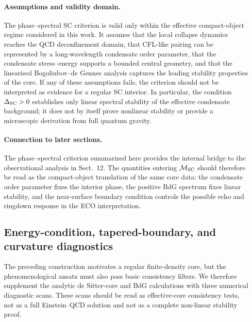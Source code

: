 \documentclass[epj]{svjour}
\begin{document}
\paragraph{Assumptions and validity domain.}
The phase--spectral SC criterion is valid only within the effective
compact-object regime considered in this work. It assumes that the local
collapse dynamics reaches the QCD deconfinement domain, that CFL-like pairing can be represented by a long-wavelength condensate order parameter, that the condensate stress--energy supports a bounded central geometry, and that the linearised Bogoliubov--de Gennes analysis captures the leading stability properties of the core. If any of these assumptions fails, the criterion should not be interpreted as evidence for a regular SC interior. In particular, the condition $\Delta_{\rm SC}>0$ establishes only linear spectral stability of the effective condensate background; it does not by itself prove nonlinear stability or provide a microscopic derivation from full quantum gravity.

\paragraph{Connection to later sections.}
The phase--spectral criterion summarized here provides the internal bridge to the observational analysis in Sect.~12. The quantities entering $\mathcal{M}_{\rm SC}$ should therefore be read as the compact-object translation of the same core data: the condensate order parameter fixes the interior phase, the positive BdG spectrum fixes linear stability, and the near-surface boundary condition controls the possible echo and ringdown response in the ECO interpretation.


\subsection{Energy-condition, tapered-boundary, and curvature diagnostics}
\label{sec:regular_core_diagnostics}

The preceding construction motivates a regular finite-density core, but the
phenomenological ansatz must also pass basic consistency filters. We therefore
supplement the analytic de Sitter-core and BdG calculations with three numerical
diagnostic scans. These scans should be read as effective-core consistency tests,
not as a full Einstein--QCD solution and not as a complete non-linear stability
proof.
\end{document}
